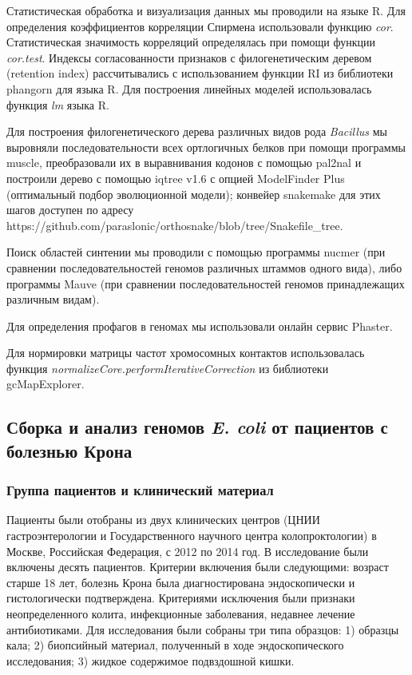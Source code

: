 Статистическая обработка и визуализация данных мы проводили на языке R. Для определения коэффициентов корреляции Спирмена использовали функцию \textit{cor}. Статистическая значимость корреляций определялась при помощи функции \textit{cor.test}. Индексы согласованности признаков с филогенетическим деревом (retention index) рассчитывались с использованием функции RI из библиотеки phangorn для языка R. Для построения линейных моделей использовалась функция \textit{lm} языка R.

Для построения филогенетического дерева различных видов рода \textit{Bacillus} мы выровняли последовательности всех ортлогичных белков при помощи программы muscle, преобразовали их в выравнивания кодонов с помощью pal2nal и построили дерево с помощью iqtree v1.6 с опцией ModelFinder Plus (оптимальный подбор эволюционной модели); конвейер snakemake для этих шагов доступен по адресу https://github.com/paraslonic/orthosnake/blob/tree/Snakefile\_tree. 

Поиск областей синтении мы проводили с помощью программы nucmer (при сравнении последовательностей геномов различных штаммов одного вида), либо программы Mauve (при сравнении последовательностей геномов принадлежащих различным видам).

Для определения профагов в геномах мы использовали онлайн сервис Phaster. 

Для нормировки матрицы частот хромосомных контактов использовалась функция \textit{normalizeCore.performIterativeCorrection} из библиотеки gcMapExplorer. 

\subsection*{Сборка и анализ геномов \textit{E. coli} от пациентов с болезнью Крона}

\subsubsection*{Группа пациентов и клинический материал}
Пациенты были отобраны из двух клинических центров (ЦНИИ гастроэнтерологии и Государственного научного центра колопроктологии) в Москве, Российская Федерация, с 2012 по 2014 год. В исследование были включены десять пациентов. Критерии включения были следующими: возраст старше 18 лет, болезнь Крона была диагностирована эндоскопически и гистологически подтверждена. Критериями исключения были признаки неопределенного колита, инфекционные заболевания, недавнее лечение антибиотиками. 
Для исследования были собраны три типа образцов: 1) образцы кала; 2) биопсийный материал, полученный в ходе эндоскопического исследования; 3) жидкое содержимое подвздошной кишки.

